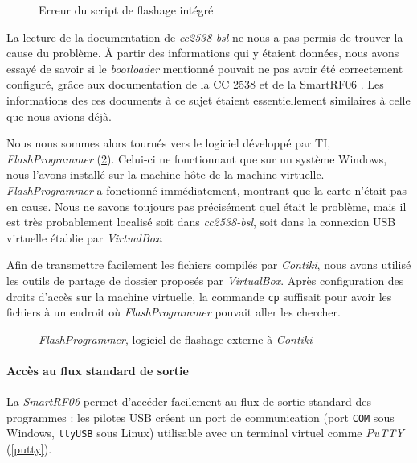 \begin{figure}[H]
\centering
{}
\caption{Erreur du script de flashage intégré}
\label{bsl-error}
\end{figure}

La lecture de la documentation de \emph{cc2538-bsl}  ne nous a pas permis de trouver la cause du problème.
À partir des informations qui y étaient données, nous avons essayé de savoir si le \textit{bootloader} mentionné pouvait ne pas avoir été correctement configuré, grâce aux documentation de la CC 2538 \cite{cc2538-user-guide} et de la SmartRF06 \cite{smartrf06-user-guide}.
Les informations des ces documents à ce sujet étaient essentiellement similaires à celle que nous avions déjà.

Nous nous sommes alors tournés vers le logiciel développé par TI, \emph{FlashProgrammer} (\cref{flashprogrammer}).
Celui-ci ne fonctionnant que sur un système Windows, nous l’avons installé sur la machine hôte de la machine virtuelle.
\emph{FlashProgrammer} a fonctionné immédiatement, montrant que la carte n’était pas en cause.
Nous ne savons toujours pas précisément quel était le problème, mais il est très probablement localisé soit dans \emph{cc2538-bsl}, soit dans la connexion USB virtuelle établie par \emph{VirtualBox}.

Afin de transmettre facilement les fichiers compilés par \emph{Contiki}, nous avons utilisé les outils de partage de dossier proposés par \emph{VirtualBox}.
Après configuration des droits d’accès sur la machine virtuelle, la commande \texttt{cp} suffisait pour avoir les fichiers à un endroit où \emph{FlashProgrammer} pouvait aller les chercher.

\begin{figure}[H]
\centering
{}
\caption{\emph{FlashProgrammer}, logiciel de flashage externe à \emph{Contiki}}
\label{flashprogrammer}
\end{figure}

\paragraph{Accès au flux standard de sortie}

La \emph{SmartRF06} permet d’accéder facilement au flux de sortie standard des programmes : les pilotes USB créent un port de communication (port \texttt{COM} sous Windows, \texttt{ttyUSB} sous Linux) utilisable avec un terminal virtuel comme \emph{PuTTY} (\cref{putty}).

